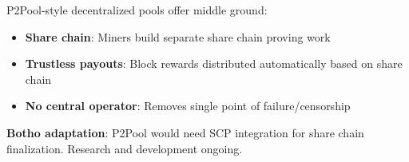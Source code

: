 P2Pool-style decentralized pools offer middle ground:

\begin{itemize}
  \item \textbf{Share chain}: Miners build separate share chain proving work
  \item \textbf{Trustless payouts}: Block rewards distributed automatically
    based on share chain
  \item \textbf{No central operator}: Removes single point of failure/censorship
\end{itemize}

\textbf{Botho adaptation}: P2Pool would need SCP integration for share chain
finalization. Research and development ongoing.

